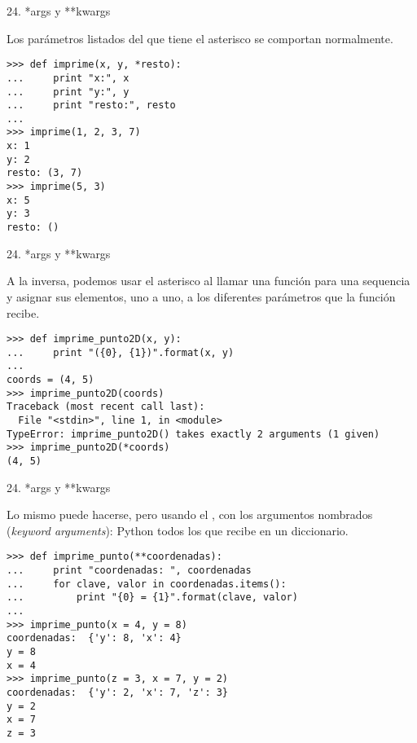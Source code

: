 \begin{frame}[fragile]{24. *args y **kwargs}
  \begin{block}{}
    \centering
    Los parámetros listados  del que tiene el
    asterisco se comportan normalmente.
  \end{block}

  \begin{exampleblock}{}
    \scriptsize
    \begin{lstlisting}
>>> def imprime(x, y, *resto):
...     print "x:", x
...     print "y:", y
...     print "resto:", resto
...
>>> imprime(1, 2, 3, 7)
x: 1
y: 2
resto: (3, 7)
>>> imprime(5, 3)
x: 5
y: 3
resto: ()
    \end{lstlisting}
  \end{exampleblock}
\end{frame}

\begin{frame}[fragile]{24. *args y **kwargs}
  \begin{block}{}
    \small
    \centering
    A la inversa, podemos usar el asterisco al llamar una función para
     una sequencia y asignar sus elementos,
    uno a uno, a los diferentes parámetros que la función recibe.
  \end{block}

  \begin{exampleblock}{}
    \scriptsize
    \begin{lstlisting}
>>> def imprime_punto2D(x, y):
...     print "({0}, {1})".format(x, y)
...
coords = (4, 5)
>>> imprime_punto2D(coords)
Traceback (most recent call last):
  File "<stdin>", line 1, in <module>
TypeError: imprime_punto2D() takes exactly 2 arguments (1 given)
>>> imprime_punto2D(*coords)
(4, 5)
    \end{lstlisting}
  \end{exampleblock}
\end{frame}

\begin{frame}[fragile]{24. *args y **kwargs}
  \begin{alertblock}{}
    \small
    \centering
    Lo mismo puede hacerse, pero usando el , con los argumentos nombrados (\emph{keyword
      arguments}): Python  todos los que recibe en
    un diccionario.
  \end{alertblock}

  \begin{exampleblock}{}
    \scriptsize
    \begin{lstlisting}
>>> def imprime_punto(**coordenadas):
...     print "coordenadas: ", coordenadas
...     for clave, valor in coordenadas.items():
...         print "{0} = {1}".format(clave, valor)
...
>>> imprime_punto(x = 4, y = 8)
coordenadas:  {'y': 8, 'x': 4}
y = 8
x = 4
>>> imprime_punto(z = 3, x = 7, y = 2)
coordenadas:  {'y': 2, 'x': 7, 'z': 3}
y = 2
x = 7
z = 3
    \end{lstlisting}
  \end{exampleblock}
\end{frame}

